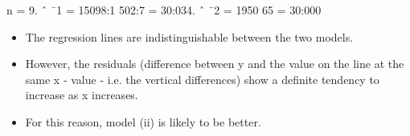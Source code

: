 \documentclass[a4paper,12pt]{article}
\begin{document}
\begin{enumerate}[(i)]
n = 9. ˆ ¯1 = 15098:1
502:7 = 30:034. ˆ ¯2 = 1950
65 = 30:000

\begin{itemize}
\item The regression lines are indistinguishable between the two models. 
\item However,
the residuals (difference between y and the value on the line at the same x
- value - i.e. the vertical differences) show a definite tendency to increase as
x increases.
\item For this reason, model (ii) is likely to be better.
\end{itemize}
\end{enumerate}
\end{document}
